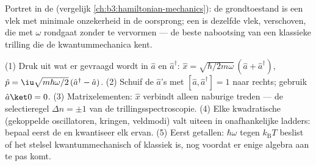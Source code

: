 \begin{omfigure}

{\small Portret in de  (vergelijk
\cref{ch:b3:hamiltonian-mechanics}): de grondtoestand is een vlek met
minimale onzekerheid in de oorsprong; een  is dezelfde
vlek, verschoven, die met $\omega$ rondgaat zonder te vervormen --- de
beste nabootsing van een klassieke trilling die de kwantummechanica kent.}
\end{omfigure}

\begin{method}\label{met:b3:harmonic-oscillator:method}
(1) Druk uit wat er gevraagd wordt in $\hat a$ en $\hat a^\dagger$: $\hat x
= \sqrt{\hbar/2m\omega}\,(\hat a + \hat a^\dagger)$, $\hat p =
\iu\sqrt{m\hbar\omega/2}\,(\hat a^\dagger - \hat a)$. (2) Schuif de $\hat a$'s met $[\hat a, \hat a^\dagger] = 1$ naar rechts; gebruik $\hat a\ket0 = 0$. (3) Matrixelementen: $\hat x$ verbindt alleen naburige treden --- de
selectieregel $\Delta n = \pm1$ van de trillingsspectroscopie. (4) Elke
kwadratische  (gekoppelde oscillatoren, kringen, veldmodi)
valt uiteen in onafhankelijke ladders: bepaal eerst de  en
kwantiseer elk ervan. (5) Eerst getallen: $\hbar\omega$ tegen
$k_{\text{B}}T$ beslist of het stelsel kwantummechanisch of klassiek is,
nog voordat er enige algebra aan te pas komt.
\end{method}

